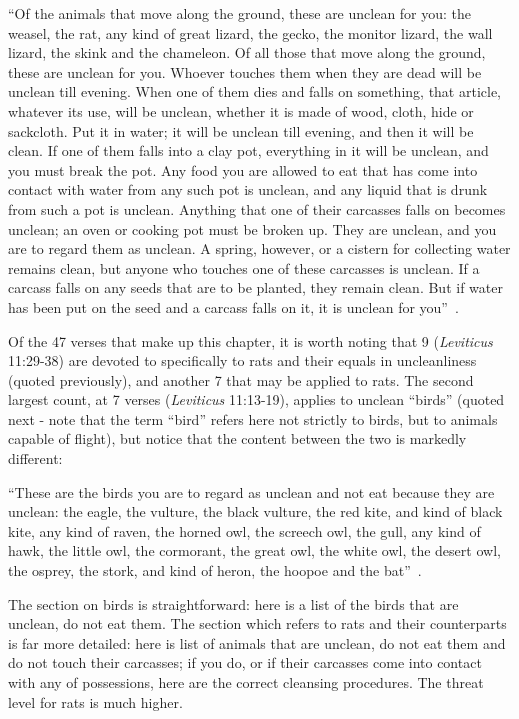 \documentclass[12pt]{article}
\begin{document}
``Of the animals that move along the ground, these are unclean for you: the weasel, the rat, any kind of great lizard, the gecko, the monitor lizard, the wall lizard, the skink and the chameleon. Of all those that move along the ground, these are unclean for you. Whoever touches them when they are dead will be unclean till evening. When one of them dies and falls on something, that article, whatever its use, will be unclean, whether it is made of wood, cloth, hide or sackcloth. Put it in water; it will be unclean till evening, and then it will be clean. If one of them falls into a clay pot, everything in it will be unclean, and you must break the pot. Any food you are allowed to eat that has come into contact with water from any such pot is unclean, and any liquid that is drunk from such a pot is unclean. Anything that one of their carcasses falls on becomes unclean; an oven or cooking pot must be broken up. They are unclean, and you are to regard them as unclean. A spring, however, or a cistern for collecting water remains clean, but anyone who touches one of these carcasses is unclean. If a carcass falls on any seeds that are to be planted, they remain clean. But if water has been put on the seed and a carcass falls on it, it is unclean for you''~\cite{Bible}.

Of the 47 verses that make up this chapter, it is worth noting that 9 (\textit{Leviticus} 11:29-38) are devoted to specifically to rats and their equals in uncleanliness (quoted previously), and another 7 that may be applied to rats. The second largest count, at 7 verses (\textit{Leviticus} 11:13-19), applies to unclean ``birds'' (quoted next - note that the term ``bird'' refers here not strictly to birds, but to animals capable of flight), but notice that the content between the two is markedly different:

``These are the birds you are to regard as unclean and not eat because they are unclean: the eagle, the vulture, the black vulture, the red kite, and kind of black kite, any kind of raven, the horned owl, the screech owl, the gull, any kind of hawk, the little owl, the cormorant, the great owl, the white owl, the desert owl, the osprey, the stork, and kind of heron, the hoopoe and the bat''~\cite{Bible}.

The section on birds is straightforward: here is a list of the birds that are unclean, do not eat them. The section which refers to rats and their counterparts is far more detailed: here is list of animals that are unclean, do not eat them and do not touch their carcasses; if you do, or if their carcasses come into contact with any of possessions, here are the correct cleansing procedures. The threat level for rats is much higher.
\end{document}
